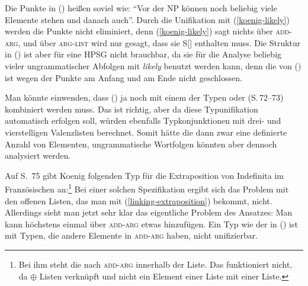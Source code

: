 \z
Die Punkte in () heißen soviel wie: "`Vor der NP können noch beliebig viele Elemente
stehen und danach auch"'. Durch die Unifikation mit (\ref{koenig-likely}) werden die Punkte
nicht eliminiert, denn (\ref{koenig-likely}) sagt nichts über \textsc{add-arg}, und über
\textsc{arg-list} wird nur gesagt, dass sie S[] enthalten muss.
Die Struktur in () ist aber für eine HPSG nicht brauchbar, da sie für
die Analyse beliebig vieler ungrammatischer Abfolgen mit \emph{likely} benutzt werden kann,
denn die \compsl von () ist wegen der Punkte am Anfang und am Ende nicht geschlossen.

Man könnte einwenden, dass () ja noch mit einem der Typen  oder
 (S.\,72--73) kombiniert werden muss. Das ist richtig, aber da diese Typunifikation
automatisch erfolgen soll, würden ebenfalls Typkonjunktionen mit drei- und vierstelligen
Valenzlisten berechnet. Somit hätte die \compsl dann zwar eine definierte Anzahl von Elementen, ungrammatische
Wortfolgen könnten aber dennoch analysiert werden.

Auf S.~75 gibt Koenig folgenden Typ für die Extraposition von Indefinita im Französischen an:\footnote{
  Bei ihm steht die  nach \textsc{add-arg} innerhalb der Liste. Das funktioniert nicht,
  da $\oplus$ Listen verknüpft und nicht ein Element einer Liste mit einer Liste.%
}
\ea
{}
\z
Bei einer solchen Spezifikation ergibt sich das Problem mit den offenen Listen,
das man mit (\ref{linking-extraposition}) bekommt, nicht. Allerdings sieht man jetzt
sehr klar das eigentliche Problem des Ansatzes: Man kann höchstens einmal über \textsc{add-arg}
etwas hinzufügen. Ein Typ wie der in () ist mit Typen, die andere Elemente
in \textsc{add-arg} haben, nicht unifizierbar.

